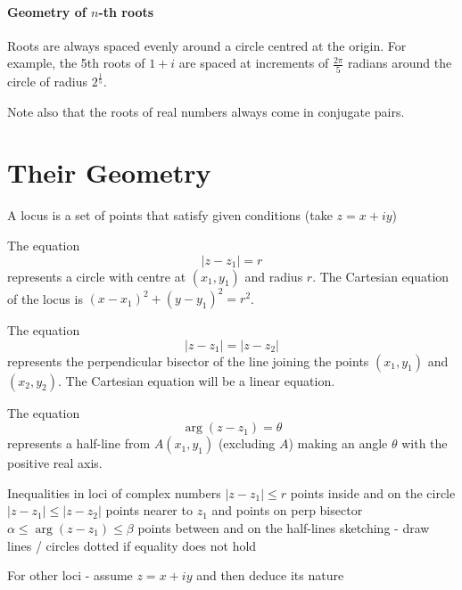 \paragraph{Geometry of $n$-th roots}
Roots are always spaced evenly around a circle centred at the origin. For example, the 5th roots of $1+i$ are spaced at increments of $\frac{2\pi}{5}$ radians around the circle of radius $2^\frac{1}{5}$.

Note also that the roots of real numbers always come in conjugate pairs.


\section{Their Geometry}

A locus is a set of points that satisfy given conditions (take $z=x+iy$)

The equation
\[ |z-z_1|=r \]
represents a circle with centre at $(x_1,y_1)$ and radius $r$. The Cartesian equation of the locus is $(x-x_1)^2+(y-y_1)^2=r^2$.

The equation 
\[ |z-z_1|=|z-z_2| \]
represents the perpendicular bisector of the line joining the points $(x_1,y_1)$ and $(x_2,y_2)$. The Cartesian equation will be a linear equation.

The equation
\[ \arg(z-z_1)=\theta \]
represents a half-line from $A(x_1,y_1)$ (excluding $A$) making an angle $\theta$ with the positive real axis.

Inequalities in loci of complex numbers
$|z-z_1|\le r$ points inside and on the circle
$|z-z_1|\le|z-z_2|$ points nearer to $z_1$ and points on perp bisector
$\alpha\le\arg(z-z_1)\le\beta$ points between and on the half-lines
sketching - draw lines / circles dotted if equality does not hold

For other loci - assume $z=x+iy$ and then deduce its nature



